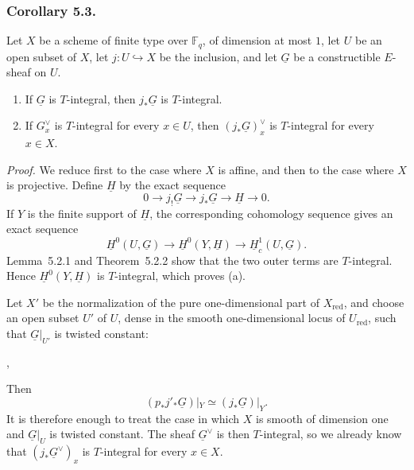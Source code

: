 \subsubsection*{Corollary 5.3.}
Let $X$ be a scheme of finite type over $\mathbb F_q$, of dimension at most
$1$, let $U$ be an open subset of $X$, let $j:U\hookrightarrow X$ be the
inclusion, and let $\underline G$ be a constructible $E$-sheaf on $U$.

\begin{enumerate}[label=(\alph*)]
\item If $\underline G$ is $T$-integral, then $j_*\underline G$ is
  $T$-integral.
\item If $G_x^\vee$ is $T$-integral for every $x\in U$, then
  $(j_*\underline G)_x^\vee$ is $T$-integral for every $x\in X$.
\end{enumerate}

\medskip
\noindent\emph{Proof.}
We reduce first to the case where $X$ is affine, and then to the case where
$X$ is projective.  Define $\underline H$ by the exact sequence
\[
0\longrightarrow j_!\underline G\longrightarrow j_*\underline G
\longrightarrow\underline H\longrightarrow0.
\]
If $Y$ is the finite support of $\underline H$, the corresponding
cohomology sequence gives an exact sequence
\[
\underline H^0(U,\underline G)\longrightarrow
\underline H^0(Y,\underline H)\longrightarrow
\underline H_c^1(U,\underline G).
\]
Lemma~5.2.1 and Theorem~5.2.2 show that the two outer terms are
$T$-integral.  Hence $\underline H^0(Y,\underline H)$ is $T$-integral,
which proves (a).

Let $X'$ be the normalization of the pure one-dimensional part of
$X_{\mathrm{red}}$, and choose an open subset $U'$ of $U$, dense in the
smooth one-dimensional locus of $U_{\mathrm{red}}$, such that
$\underline G|_{U'}$ is twisted constant:
\begin{center}
\qquad ,
\end{center}
Then
\[
(p_*j'_*\underline G)|_Y\simeq(j_*\underline G)|_Y.
\]
It is therefore enough to treat the case in which $X$ is smooth of
dimension one and $\underline G|_U$ is twisted constant.  The sheaf
$\underline G^\vee$ is then $T$-integral, so we already know that
$(j_*\underline G^\vee)_x$ is $T$-integral for every $x\in X$.

